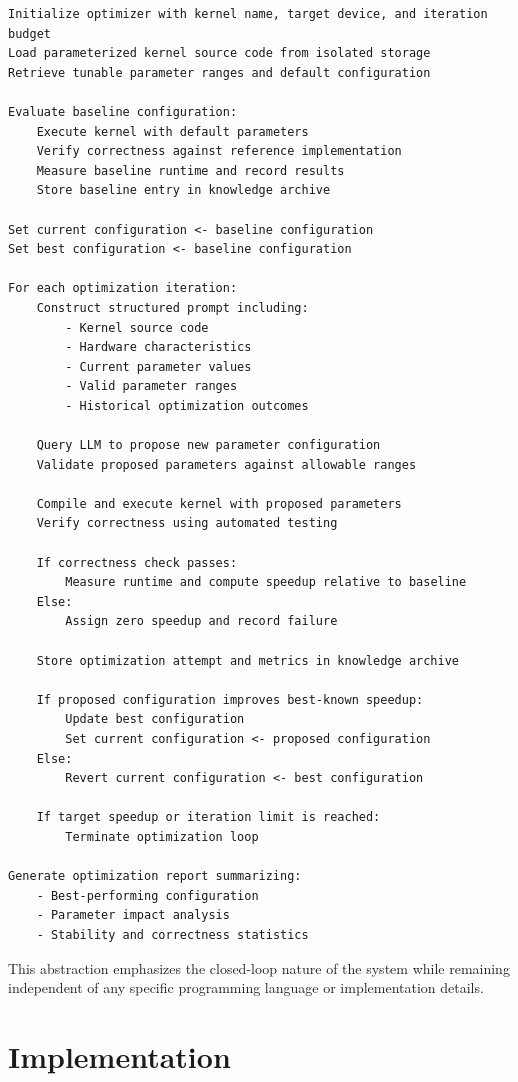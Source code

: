 \documentclass{article}
\begin{document}
\begin{Verbatim}[formatcom=\color{mycodecolor}]
Initialize optimizer with kernel name, target device, and iteration budget
Load parameterized kernel source code from isolated storage
Retrieve tunable parameter ranges and default configuration

Evaluate baseline configuration:
    Execute kernel with default parameters
    Verify correctness against reference implementation
    Measure baseline runtime and record results
    Store baseline entry in knowledge archive

Set current configuration <- baseline configuration
Set best configuration <- baseline configuration

For each optimization iteration:
    Construct structured prompt including:
        - Kernel source code
        - Hardware characteristics
        - Current parameter values
        - Valid parameter ranges
        - Historical optimization outcomes

    Query LLM to propose new parameter configuration
    Validate proposed parameters against allowable ranges

    Compile and execute kernel with proposed parameters
    Verify correctness using automated testing

    If correctness check passes:
        Measure runtime and compute speedup relative to baseline
    Else:
        Assign zero speedup and record failure

    Store optimization attempt and metrics in knowledge archive

    If proposed configuration improves best-known speedup:
        Update best configuration
        Set current configuration <- proposed configuration
    Else:
        Revert current configuration <- best configuration

    If target speedup or iteration limit is reached:
        Terminate optimization loop

Generate optimization report summarizing:
    - Best-performing configuration
    - Parameter impact analysis
    - Stability and correctness statistics
\end{Verbatim}

This abstraction emphasizes the closed-loop nature of the system while remaining independent of any specific programming language or implementation details.

\section {Implementation}
\end{document}
